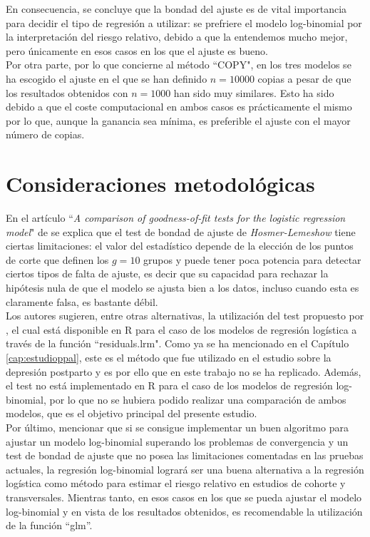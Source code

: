 En consecuencia, se concluye que la bondad del ajuste es de vital importancia para decidir el tipo de regresión a utilizar: se prefriere el modelo log-binomial por la interpretación del riesgo relativo, debido a que la entendemos mucho mejor, pero únicamente en esos casos en los que el ajuste es bueno. \\


Por otra parte, por lo que concierne al método ``COPY", en los tres modelos se ha escogido el ajuste en el que se han definido $n=10000$ copias a pesar de que los resultados obtenidos con $n=1000$ han sido muy similares. Esto ha sido debido a que el coste computacional en ambos casos es prácticamente el mismo por lo que, aunque la ganancia sea mínima, es preferible el ajuste con el mayor número de copias.

\section{Consideraciones metodológicas}

En el artículo ``\textit{A comparison of goodness-of-fit tests for the logistic regression model}" de \textcite{limitacioneshosmer} se explica que el test de bondad de ajuste de \textit{Hosmer-Lemeshow} tiene ciertas limitaciones: el valor del estadístico depende de la elección de los puntos de corte que definen los $g=10$ grupos y puede tener poca potencia para detectar ciertos tipos de falta de ajuste, es decir que su capacidad para rechazar la hipótesis nula de que el modelo se ajusta bien a los datos, incluso cuando esta es claramente falsa, es bastante débil. \\

Los autores sugieren, entre otras alternativas, la utilización del test propuesto por  \textcite{bondad}, el cual está disponible en R para el caso de los modelos de regresión logística a través de la función ``residuals.lrm". Como ya se ha mencionado en el Capítulo \ref{cap:estudioppal}, este es el método que fue utilizado en el estudio sobre la depresión postparto y es por ello que en este trabajo no se ha replicado. Además, el test no está implementado en R para el caso de los modelos de regresión log-binomial, por lo que no se hubiera podido realizar una comparación de ambos modelos, que es el objetivo principal del presente estudio. \\

Por último, mencionar que si se consigue implementar un buen algoritmo para ajustar un modelo log-binomial superando los problemas de convergencia y un test de bondad de ajuste que no posea las limitaciones comentadas en las pruebas actuales, la regresión log-binomial logrará ser una buena alternativa a la regresión logística como método para estimar el riesgo relativo en estudios de cohorte y transversales. Mientras tanto, en esos casos en los que se pueda ajustar el modelo log-binomial y en vista de los resultados obtenidos, es recomendable la utilización de la función ``glm''.